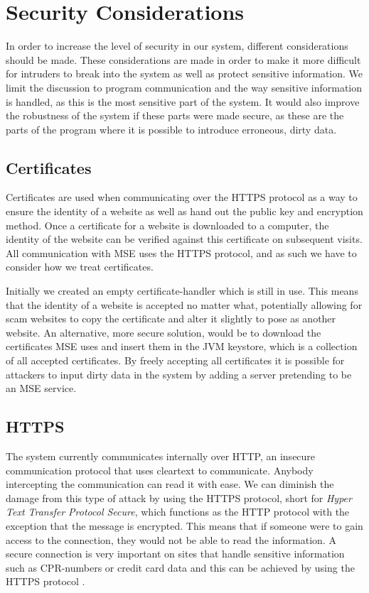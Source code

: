 \section{Security Considerations}\label{sec:secure}
In order to increase the level of security in our system, different considerations should be made. These considerations are made in order to make it more difficult for intruders to break into the system as well as protect sensitive information. We limit the discussion to program communication and the way sensitive information is handled, as this is the most sensitive part of the system. It would also improve the robustness of the system if these parts were made secure, as these are the parts of the program where it is possible to introduce erroneous, dirty data.

\subsection*{Certificates}
Certificates are used when communicating over the HTTPS protocol as a way to ensure the identity of a website as well as hand out the public key and encryption method. Once a certificate for a website is downloaded to a computer, the identity of the website can be verified against this certificate on subsequent visits. All communication with MSE uses the HTTPS protocol, and as such we have to consider how we treat certificates. 

Initially we created an empty certificate-handler which is still in use. This means that the identity of a website is accepted no matter what, potentially allowing for scam websites to copy the certificate and alter it slightly to pose as another website. An alternative, more secure solution, would be to download the certificates MSE uses and insert them in the JVM keystore, which is a collection of all accepted certificates. By freely accepting all certificates it is possible for attackers to input dirty data in the system by adding a server pretending to be an MSE service.

\subsection*{HTTPS}
The system currently communicates internally over HTTP, an insecure communication protocol that uses cleartext to communicate. Anybody intercepting the communication can read it with ease. We can diminish the damage from this type of attack by using the HTTPS protocol, short for \textit{Hyper Text Transfer Protocol Secure}, which functions as the HTTP protocol with the exception that the message is encrypted. This means that if someone were to gain access to the connection, they would not be able to read the information. A secure connection is very important on sites that handle sensitive information such as CPR-numbers or credit card data and this can be achieved by using the HTTPS protocol \cite{HTTPS}.

